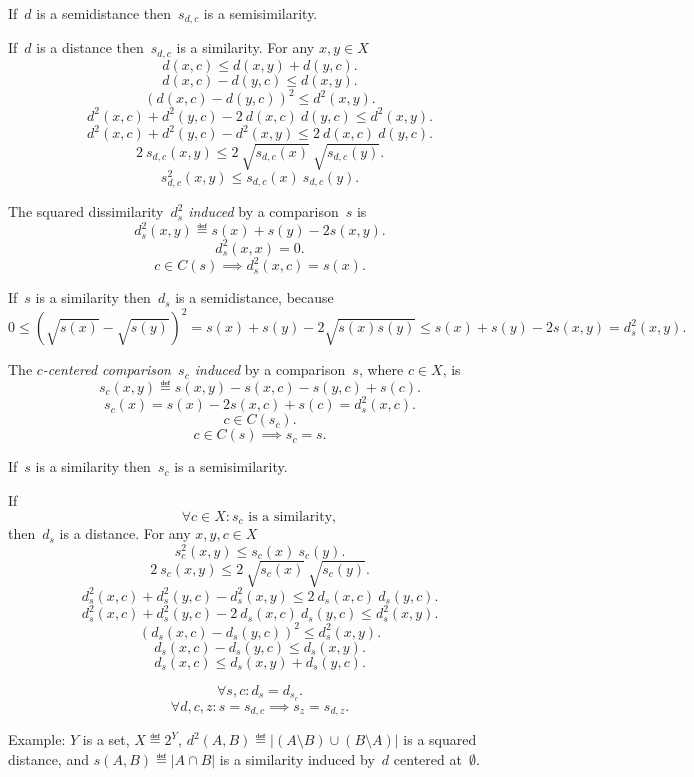 \documentclass[10pt,a4paper]{article}
\theoremstyle{plain} \newtheorem{Lem}{Lemma}
\begin{document}
If~$d$ is a semidistance then~$s_{d,c}$ is a semisimilarity.

If~$d$ is a distance then~$s_{d,c}$ is a similarity.
\proof 
{
    For any $x,y \in X$
    $$ d(x,c) \le d(x,y) + d(y,c). $$
    $$ d(x,c) - d(y,c) \le d(x,y). $$
    $$ \left(d(x,c) - d(y,c) \right)^2 \le d^2(x,y). $$
    $$ d^2(x,c) + d^2(y,c) - 2 \ d(x,c) \ d(y,c) \le d^2(x,y). $$
    $$ d^2(x,c) + d^2(y,c) - d^2(x,y) \le 2 \ d(x,c) \ d(y,c) . $$
    $$ 2 \ s_{d,c}(x,y) \le 2 \ \sqrt{s_{d,c}(x)} \ \sqrt{s_{d,c}(y)}. $$
    $$ s_{d,c}^2(x,y) \le s_{d,c}(x) \ s_{d,c}(y). $$
}

The squared dissimilarity~$d_s^2$ {\em induced} by a comparison~$s$ is
\begin{equation}\label{s2d}
  d_s^2(x,y) \eqdef s(x) + s(y) - 2 s(x,y). 
\end{equation}
$$ d_s^2(x,x) = 0. $$
$$ c \in C(s) \implies d_s^2(x,c) = s(x). $$

If~$s$ is a similarity then~$d_s$ is a semidistance,
because 
$$ 0 \le \left(\sqrt{s(x)} - \sqrt{s(y)} \right)^2 = s(x) + s(y) - 2 \sqrt{s(x) s(y)} \le s(x) + s(y) - 2 s(x,y) = d_s^2(x,y). $$

The {\em $c$-centered comparison~$s_c$ induced} by a comparison~$s$, where $c \in X$, is
$$ s_c(x,y) \eqdef s(x,y) - s(x,c) - s(y,c) + s(c). $$
$$ s_c(x) = s(x) - 2 s(x,c) + s(c) = d_s^2(x,c). $$
$$ c \in C(s_c). $$
$$ c \in C(s) \implies s_c = s. $$

If~$s$ is a similarity then~$s_c$ is a semisimilarity.

If
$$\forall c \in X : s_c \text{ is a similarity}, $$
then~$d_s$ is a distance.
\proof 
{
  For any $x,y,c \in X$
  $$ s_c^2(x,y) \le s_c(x) \ s_c(y). $$
  $$ 2 \ s_c(x,y) \le 2 \ \sqrt{s_c(x)} \ \sqrt{s_c(y)}. $$
  $$ d_s^2(x,c) + d_s^2(y,c) - d_s^2(x,y) \le 2 \ d_s(x,c) \ d_s(y,c) . $$
  $$ d_s^2(x,c) + d_s^2(y,c) - 2 \ d_s(x,c) \ d_s(y,c) \le d_s^2(x,y). $$
  $$ \left(d_s(x,c) - d_s(y,c) \right)^2 \le d_s^2(x,y). $$
  $$ d_s(x,c) - d_s(y,c) \le d_s(x,y). $$
  $$ d_s(x,c) \le d_s(x,y) + d_s(y,c). $$
}


$$ \forall s, c : d_s = d_{s_c}. $$
$$ \forall d, c, z : s = s_{d,c} \implies s_z = s_{d,z} . $$

Example: $Y$ is a set, $X \eqdef 2^Y$, $d^2(A,B) \eqdef |(A \setminus B) \cup (B \setminus A)|$ is a squared distance, 
and $s(A,B) \eqdef |A \cap B|$ is a similarity induced by~$d$ centered at~$\emptyset$.
\end{document}
